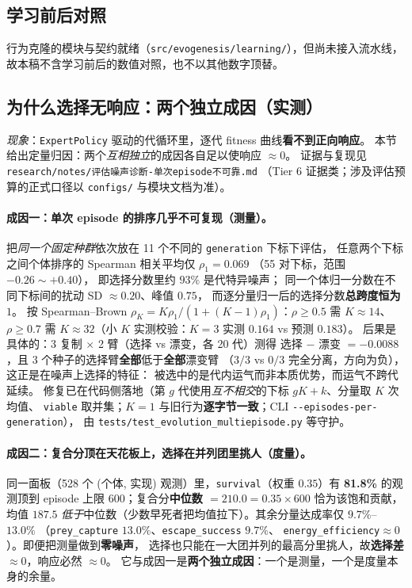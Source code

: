 \subsection{学习前后对照}

行为克隆的模块与契约就绪（\texttt{src/evogenesis/learning/}），但尚未接入流水线，
故本稿不含学习前后的数值对照，也不以其他数字顶替。

\subsection{为什么选择无响应：两个独立成因（实测）}

\emph{现象}：\texttt{ExpertPolicy} 驱动的代循环里，逐代 fitness 曲线\textbf{看不到正向响应}。
本节给出定量归因：两个\emph{互相独立}的成因各自足以使响应 $\approx 0$。
证据与复现见 \texttt{research/notes/评估噪声诊断-单次episode不可靠.md}
（Tier 6 证据类；涉及评估预算的正式口径以 \texttt{configs/} 与模块文档为准）。

\paragraph{成因一：单次 episode 的排序几乎不可复现（测量）。}
把\emph{同一个固定种群}依次放在 11 个不同的 \texttt{generation} 下标下评估，
任意两个下标之间个体排序的 Spearman 相关平均仅 $\rho_1 = 0.069$
（55 对下标，范围 $-0.26\sim+0.40$）， 即选择分数里约 $93\%$ 是代特异噪声；
同一个体归一分数在不同下标间的扰动 SD $\approx 0.20$、峰值 $0.75$，
而逐分量归一后的选择分数\textbf{总跨度恒为 $1$}。
按 Spearman--Brown $\rho_K = K\rho_1/(1+(K-1)\rho_1)$：$\rho\ge0.5$ 需 $K\approx14$、
$\rho\ge0.7$ 需 $K\approx32$（小 $K$ 实测校验：$K=3$ 实测 $0.164$ vs 预测 $0.183$）。
后果是具体的：3 复制 $\times$ 2 臂（选择 vs 漂变，各 20 代）测得
选择 $-$ 漂变 $= -0.0088$，且 3 个种子的选择臂\textbf{全部}低于\textbf{全部}漂变臂
（$3/3$ vs $0/3$ 完全分离，方向为负）， 这正是在噪声上选择的特征：
被选中的是代内运气而非本质优势，而运气不跨代延续。
修复已在代码侧落地（第 $g$ 代使用\emph{互不相交}的下标 $gK+k$、分量取 $K$ 次均值、
\texttt{viable} 取并集；$K=1$ 与旧行为\textbf{逐字节一致}；CLI \texttt{-{}-episodes-per-generation}），
由 \texttt{tests/test\_evolution\_multiepisode.py} 等守护。

\paragraph{成因二：复合分顶在天花板上，选择在并列团里挑人（度量）。}
同一面板（528 个 (个体, 实现) 观测）里，\texttt{survival}（权重 $0.35$）有 \textbf{81.8\%}
的观测顶到 episode 上限 $600$；复合分\textbf{中位数 $=210.0=0.35\times600$} 恰为该饱和贡献，
均值 $187.5$ \emph{低于}中位数（少数早死者把均值拉下）。其余分量达成率仅 $9.7\%$--$13.0\%$
（\texttt{prey\_capture} $13.0\%$、\texttt{escape\_success} $9.7\%$、
\texttt{energy\_efficiency}$\approx0$）。即便把测量做到\textbf{零噪声}，
选择也只能在一大团并列的最高分里挑人，故\textbf{选择差 $\approx0$}，响应必然 $\approx0$。
它与成因一是\textbf{两个独立成因}：一个是测量，一个是度量本身的余量。

